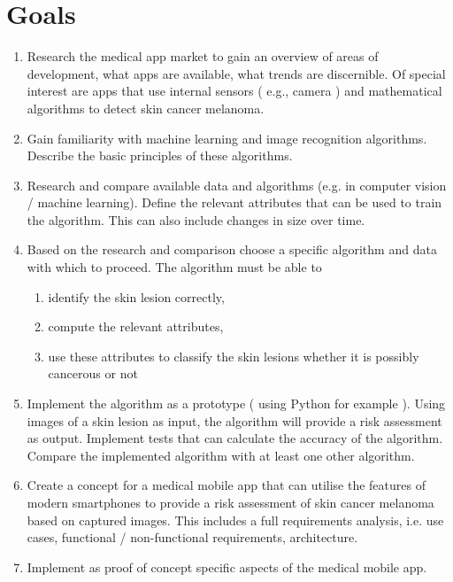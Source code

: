 \section{Goals}

\noindent
\begin{enumerate}
\item Research the medical app market to gain an overview of areas of development, what apps are available, what trends are discernible. Of special interest are apps that use internal sensors ( e.g., camera ) and mathematical algorithms to detect skin cancer melanoma.

\item Gain familiarity with machine learning and image recognition algorithms. Describe the basic principles of these algorithms.
\item Research and compare available data and algorithms (e.g. in computer vision / machine learning). Define the relevant attributes that can be used to train the algorithm. This can also include changes in size over time.

\item Based on the research and comparison choose a specific algorithm and data with which to proceed. The algorithm must be able to
\begin{enumerate}
\item identify the skin lesion correctly,
\item compute the relevant attributes,
\item use these attributes to classify the skin lesions whether it is possibly cancerous or not
\end{enumerate}
\item Implement the algorithm as a prototype ( using Python for example ). Using images of a skin lesion as input, the algorithm will provide a risk assessment as output. Implement tests that can calculate the accuracy of the algorithm. Compare the implemented algorithm with at least one other algorithm.

\item Create a concept for a medical mobile app that can utilise the features of modern smartphones to provide a risk assessment of skin cancer melanoma based on captured images. This includes a full requirements analysis, i.e. use cases, functional / non-functional requirements, architecture.

\item Implement as proof of concept specific aspects of the medical mobile app.

\end{enumerate}

